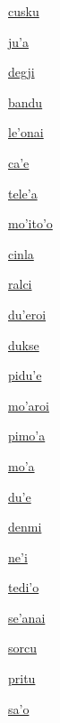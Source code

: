 {\hyperlink{val:cusku}{cusku}}{}{}{}

{\hyperlink{val:juha}{ju'a}}{}{}{}

{\hyperlink{val:degji}{degji}}{}{}{}

{\hyperlink{val:bandu}{bandu}}{}{}{}

{\hyperlink{val:lehonai}{le'onai}}{}{}{}

{\hyperlink{val:cahe}{ca'e}}{}{}{}

{\hyperlink{val:teleha}{tele'a}}{}{}{}

{\hyperlink{val:mohitoho}{mo'ito'o}}{}{}{}

{\hyperlink{val:cinla}{cinla}}{}{}{}

{\hyperlink{val:ralci}{ralci}}{}{}{}

{\hyperlink{val:duheroi}{du'eroi}}{}{}{}

{\hyperlink{val:dukse}{dukse}}{}{}{}

{\hyperlink{val:piduhe}{pidu'e}}{}{}{}

{\hyperlink{val:moharoi}{mo'aroi}}{}{}{}

{\hyperlink{val:pimoha}{pimo'a}}{}{}{}

{\hyperlink{val:moha}{mo'a}}{}{}{}

{\hyperlink{val:duhe}{du'e}}{}{}{}

{\hyperlink{val:denmi}{denmi}}{}{}{}

{\hyperlink{val:nehi}{ne'i}}{}{}{}

{\hyperlink{val:tediho}{tedi'o}}{}{}{}

{\hyperlink{val:sehanai}{se'anai}}{}{}{}

{\hyperlink{val:sorcu}{sorcu}}{}{}{}

{\hyperlink{val:pritu}{pritu}}{}{}{}

{\hyperlink{val:saho}{sa'o}}{}{}{}

